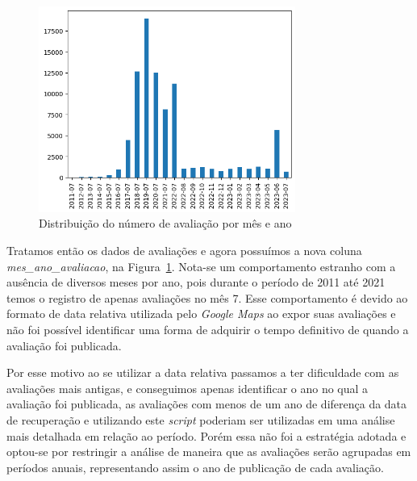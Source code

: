 \begin{figure}
	\centering
	\includegraphics[width=0.75\textwidth]{figs/exploratoria/distribuicao_ano_mes_avaliacao.png}
	\caption{Distribuição do número de avaliação por mês e ano}
	\label{img:dist_ano_mes_avaliacao}
\end{figure}

Tratamos então os dados de avaliações e agora possuímos a nova coluna \textit{mes\_ano\_avaliacao}, na Figura~\ref{img:dist_ano_mes_avaliacao}. Nota-se um comportamento estranho com a ausência de diversos meses por ano, pois durante o período de 2011 até 2021 temos o registro de apenas avaliações no mês 7. Esse comportamento é devido ao formato de data relativa utilizada pelo \textit{Google Maps} ao expor suas avaliações e não foi possível identificar uma forma de adquirir o tempo definitivo de quando a avaliação foi publicada.

Por esse motivo ao se utilizar a data relativa passamos a ter dificuldade com as avaliações mais antigas, e conseguimos apenas identificar o ano no qual a avaliação foi publicada, as avaliações com menos de um ano de diferença da data de recuperação e utilizando este \textit{script} poderiam ser utilizadas em uma análise mais detalhada em relação ao período. Porém essa não foi a estratégia adotada e optou-se por restringir a análise de maneira que as avaliações serão agrupadas em períodos anuais, representando assim o ano de publicação de cada avaliação.

